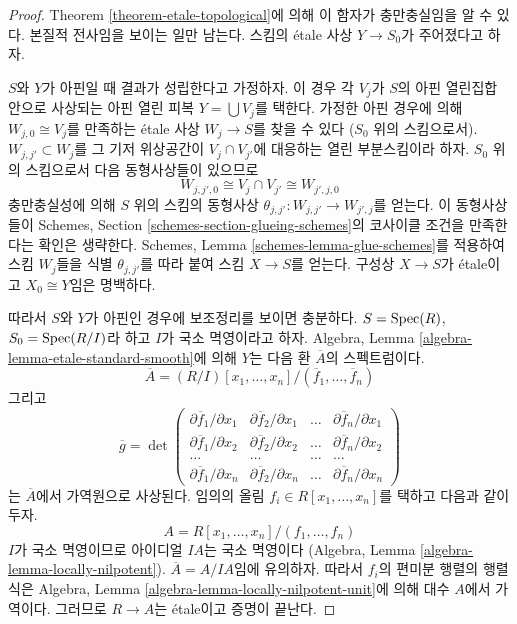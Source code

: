 \begin{proof}
Theorem \ref{theorem-etale-topological}에 의해 이 함자가
충만충실임을 알 수 있다. 본질적 전사임을 보이는 일만 남는다.
스킴의 \'etale 사상 $Y \to S_0$가 주어졌다고 하자.

\medskip\noindent
$S$와 $Y$가 아핀일 때 결과가 성립한다고 가정하자.
이 경우 각 $V_j$가 $S$의 아핀 열린집합 안으로 사상되는
아핀 열린 피복 $Y = \bigcup V_j$를 택한다.
가정한 아핀 경우에 의해 $W_{j, 0} \cong V_j$를 만족하는
\'etale 사상 $W_j \to S$를 찾을 수 있다
($S_0$ 위의 스킴으로서).
$W_{j, j'} \subset W_j$를 그 기저 위상공간이
$V_j \cap V_{j'}$에 대응하는 열린 부분스킴이라 하자.
$S_0$ 위의 스킴으로서 다음 동형사상들이 있으므로
$$
W_{j, j', 0} \cong V_j \cap V_{j'} \cong W_{j', j, 0}
$$
충만충실성에 의해 $S$ 위의 스킴의 동형사상
$\theta_{j, j'} : W_{j, j'} \to W_{j', j}$를 얻는다.
이 동형사상들이 Schemes, Section
\ref{schemes-section-glueing-schemes}의 코사이클 조건을
만족한다는 확인은 생략한다.
Schemes, Lemma \ref{schemes-lemma-glue-schemes}를 적용하여
스킴 $W_j$들을 식별 $\theta_{j, j'}$를 따라 붙여
스킴 $X \to S$를 얻는다. 구성상 $X \to S$가 \'etale이고
$X_0 \cong Y$임은 명백하다.

\medskip\noindent
따라서 $S$와 $Y$가 아핀인 경우에 보조정리를 보이면 충분하다.
$S = \mathop{\mathrm{Spec}}(R)$, $S_0 = \mathop{\mathrm{Spec}}(R/I)$라 하고 $I$가 국소 멱영이라고 하자.
Algebra, Lemma \ref{algebra-lemma-etale-standard-smooth}에 의해
$Y$는 다음 환 $\overline{A}$의 스펙트럼이다.
$$
\overline{A} = (R/I)[x_1, \ldots, x_n]/(\overline{f}_1, \ldots, \overline{f}_n)
$$
그리고
$$
\overline{g} =
\det
\left(
\begin{matrix}
\partial \overline{f}_1/\partial x_1 &
\partial \overline{f}_2/\partial x_1 &
\ldots &
\partial \overline{f}_n/\partial x_1 \\
\partial \overline{f}_1/\partial x_2 &
\partial \overline{f}_2/\partial x_2 &
\ldots &
\partial \overline{f}_n/\partial x_2 \\
\ldots & \ldots & \ldots & \ldots \\
\partial \overline{f}_1/\partial x_n &
\partial \overline{f}_2/\partial x_n &
\ldots &
\partial \overline{f}_n/\partial x_n
\end{matrix}
\right)
$$
는 $\overline{A}$에서 가역원으로 사상된다.
임의의 올림 $f_i \in R[x_1, \ldots, x_n]$를 택하고 다음과 같이 두자.
$$
A = R[x_1, \ldots, x_n]/(f_1, \ldots, f_n)
$$
$I$가 국소 멱영이므로 아이디얼 $IA$는 국소 멱영이다
(Algebra, Lemma \ref{algebra-lemma-locally-nilpotent}).
$\overline{A} = A/IA$임에 유의하자.
따라서 $f_i$의 편미분 행렬의 행렬식은
Algebra, Lemma \ref{algebra-lemma-locally-nilpotent-unit}에 의해
대수 $A$에서 가역이다. 그러므로 $R \to A$는 \'etale이고
증명이 끝난다.
\end{proof}




